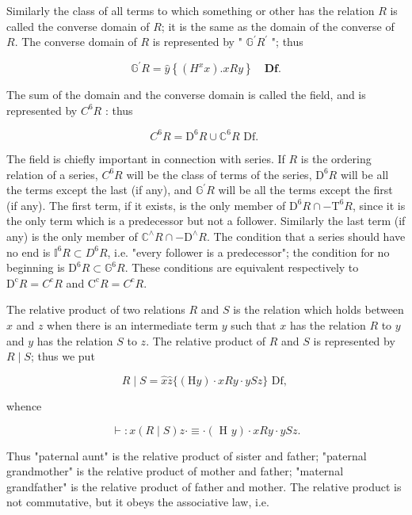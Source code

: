 \documentclass[10pt]{article}
\begin{document}
Similarly the class of all terms to which something or other has the relation $R$ is called the converse domain of $R$; it is the same as the domain of the converse of $R$. The converse domain of $R$ is represented by " $\mathbb{G}^{\prime} R^{\prime}$ "; thus

$$
\mathbb{G}^{\prime} R=\hat{y}\left\{\left(H^{x} x\right) . x R y\right\} \quad \mathbf{D f} .
$$

The sum of the domain and the converse domain is called the field, and is represented by $C^{6} R$ : thus

$$
C^{6} R=\mathrm{D}^{6} R \cup \mathbb{C}^{6} R \text { Df. }
$$

The field is chiefly important in connection with series. If $R$ is the ordering relation of a series, $C^{6} R$ will be the class of terms of the series, $\mathrm{D}^{6} R$ will be all the terms except the last (if any), and $\mathbb{G}^{\prime} R$ will be all the terms except the first (if any). The first term, if it exists, is the only member of $\mathrm{D}^{6} R \cap-\mathrm{T}^{6} R$, since it is the only term which is a predecessor but not a follower. Similarly the last term (if any) is the only member of $\mathbb{C}^{\wedge} R \cap-\mathrm{D}^{\wedge} R$. The condition that a series should have no end is $\mathbb{I}^{6} R \subset D^{6} R$, i.e. "every follower is a predecessor"; the condition for no beginning is $\mathrm{D}^{6} R \subset \mathbb{G}^{6} R$. These conditions are equivalent respectively to $\mathrm{D}^{\mathrm{c}} R=C^{\mathrm{c}} R$ and $\mathrm{C}^{\mathrm{c}} R=C^{\mathrm{c}} R$.

The relative product of two relations $R$ and $S$ is the relation which holds between $x$ and $z$ when there is an intermediate term $y$ such that $x$ has the relation $R$ to $y$ and $y$ has the relation $S$ to $z$. The relative product of $R$ and $S$ is represented by $R \mid S$; thus we put

$$
R \mid S=\widehat{x} \hat{z}\{(\mathrm{H} y) \cdot x R y \cdot y S z\} \text { Df, }
$$

whence

$$
\vdash: x(R \mid S) z \cdot \equiv \cdot(\text { H } y) \cdot x R y \cdot y S z .
$$

Thus "paternal aunt" is the relative product of sister and father; "paternal grandmother" is the relative product of mother and father; "maternal grandfather" is the relative product of father and mother. The relative product is not commutative, but it obeys the associative law, i.e.
\end{document}
